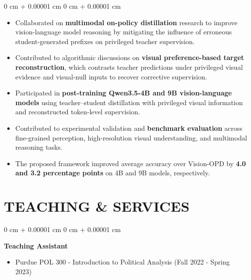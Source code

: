 \documentclass[10pt, letterpaper]{article}
\newenvironment{highlights}{
    \begin{itemize}[
        topsep=0.10 cm,
        parsep=0.10 cm,
        partopsep=0pt,
        itemsep=0pt,
        leftmargin=0 cm + 10pt
    ]
}{
    \end{itemize}
} %
\newenvironment{onecolentry}{
    \begin{adjustwidth}{
        0 cm + 0.00001 cm
    }{
        0 cm + 0.00001 cm
    }
}{
    \end{adjustwidth}
} %
\begin{document}
\vspace{0.05 cm}
\begin{onecolentry}
    \begin{highlights}
        \item Collaborated on \textbf{multimodal on-policy distillation} research to improve vision-language model reasoning by mitigating the influence of erroneous student-generated prefixes on privileged teacher supervision.

        \item Contributed to algorithmic discussions on \textbf{visual preference-based target reconstruction}, which contrasts teacher predictions under privileged visual evidence and visual-null inputs to recover corrective supervision.

        \item Participated in \textbf{post-training Qwen3.5-4B and 9B vision-language models} using teacher--student distillation with privileged visual information and reconstructed token-level supervision.

        \item Contributed to experimental validation and \textbf{benchmark evaluation} across fine-grained perception, high-resolution visual understanding, and multimodal reasoning tasks.

        \item The proposed framework improved average accuracy over Vision-OPD by \textbf{4.0 and 3.2 percentage points} on 4B and 9B models, respectively.
    \end{highlights}
\end{onecolentry}














    \section{TEACHING \& SERVICES}
    
    \begin{onecolentry}
    \textbf{Teaching Assistant} 
    \begin{highlights}
    \item Purdue POL 300 - Introduction to Political Analysis (Fall 2022 - Spring 2023)
    \end{highlights}
    \end{onecolentry}
\end{document}
